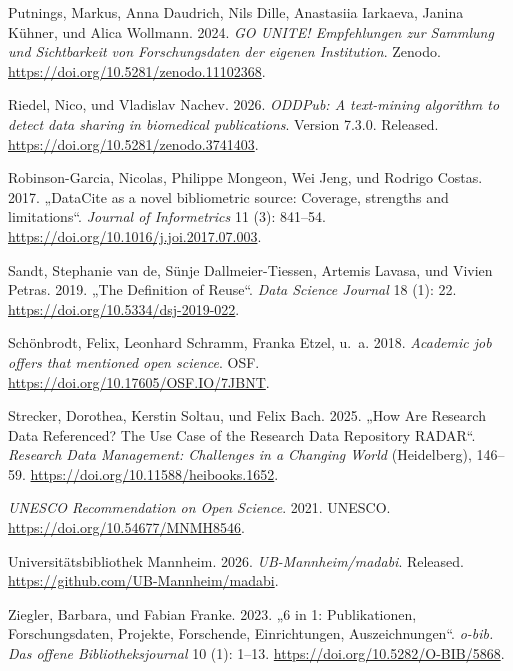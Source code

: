 \documentclass[
  ngerman,
  letterpaper,
  DIV=11]{scrreprt}
\newlength{\cslhangindent}
\newenvironment{CSLReferences}[2] %
 {\begin{list}{}{%
  \setlength{\itemindent}{0pt}
  \setlength{\leftmargin}{0pt}
  \setlength{\parsep}{0pt}
  \ifodd #1
   \setlength{\leftmargin}{\cslhangindent}
   \setlength{\itemindent}{-1\cslhangindent}
  \fi
  \setlength{\itemsep}{#2\baselineskip}}}
 {\end{list}}
\begin{document}
\begin{CSLReferences}{1}{1}
Putnings, Markus, Anna Daudrich, Nils Dille, Anastasiia Iarkaeva, Janina
Kühner, und Alica Wollmann. 2024. \emph{{GO} {UNITE}! Empfehlungen zur
Sammlung und Sichtbarkeit von Forschungsdaten der eigenen Institution}.
Zenodo. \url{https://doi.org/10.5281/zenodo.11102368}.

Riedel, Nico, und Vladislav Nachev. 2026. \emph{{ODDPub}: A text-mining
algorithm to detect data sharing in biomedical publications}. Version
7.3.0. Released. \url{https://doi.org/10.5281/zenodo.3741403}.

Robinson-Garcia, Nicolas, Philippe Mongeon, Wei Jeng, und Rodrigo
Costas. 2017. {„{DataCite} as a novel bibliometric source: Coverage,
strengths and limitations``}. \emph{Journal of Informetrics} 11 (3):
841--54. \url{https://doi.org/10.1016/j.joi.2017.07.003}.

Sandt, Stephanie van de, Sünje Dallmeier-Tiessen, Artemis Lavasa, und
Vivien Petras. 2019. {„The Definition of Reuse``}. \emph{Data Science
Journal} 18 (1): 22. \url{https://doi.org/10.5334/dsj-2019-022}.

Schönbrodt, Felix, Leonhard Schramm, Franka Etzel, u.~a. 2018.
\emph{Academic job offers that mentioned open science}. {OSF}.
\url{https://doi.org/10.17605/OSF.IO/7JBNT}.

Strecker, Dorothea, Kerstin Soltau, und Felix Bach. 2025. {„How Are
Research Data Referenced? The Use Case of the Research Data Repository
{RADAR}``}. \emph{Research Data Management: Challenges in a Changing
World} (Heidelberg), 146--59.
\url{https://doi.org/10.11588/heibooks.1652}.

\emph{{UNESCO} Recommendation on Open Science}. 2021. {UNESCO}.
\url{https://doi.org/10.54677/MNMH8546}.

Universitätsbibliothek Mannheim. 2026. \emph{{UB}-Mannheim/madabi}.
Released. \url{https://github.com/UB-Mannheim/madabi}.

Ziegler, Barbara, und Fabian Franke. 2023. {„6 in 1: Publikationen,
Forschungsdaten, Projekte, Forschende, Einrichtungen, Auszeichnungen``}.
\emph{o-bib. Das offene Bibliotheksjournal} 10 (1): 1--13.
\url{https://doi.org/10.5282/O-BIB/5868}.

\end{CSLReferences}
\end{document}

